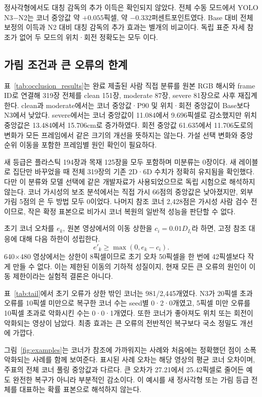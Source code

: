 정사각형에서도 대칭 감독의 추가 이득은 확인되지 않았다. 전체 수동 모드에서 YOLO N3−N2는 코너 중앙값 약 $+0.055$픽셀, \pckten 약 $-0.332$퍼센트포인트였다. Base 대비 전체 보정의 이득과 N2 대비 대칭 감독의 추가 효과는 별개의 비교이다. 독립 표준 자세 참조가 없어 두 모드의 위치·회전 정확도는 모두 \notrun 이다.

\subsection{가림 조건과 큰 오류의 한계}
표~\ref{tab:occlusion_results}는 완료 제출된 사람 직접 분류를 원본 RGB 해시와 frame ID로 연결해 319장 전체를 clean 151장, moderate 87장, severe 81장으로 사후 재집계한다. clean과 moderate에서는 코너 중앙값·P90 및 위치·회전 중앙값이 Base보다 N3에서 낮았다. severe에서는 코너 중앙값이 11.084에서 9.696픽셀로 감소했지만 위치 중앙값은 13.484에서 15.706cm로 증가하였다. 회전 중앙값 61.635에서 11.706도로의 변화가 모든 프레임에서 같은 크기의 개선을 뜻하지는 않는다. 가설 선택 변화와 중앙 순위 이동을 포함한 프레임별 원인 확인이 필요하다.


새 등급은 플라스틱 194장과 목재 125장을 모두 포함하며 미분류는 0장이다. 새 레이블로 집단만 바꾸었을 때 전체 319장의 기존 2D·6D 수치가 정확히 유지됨을 확인했다. 다만 이 분류와 모델 선택에 같은 개발자료가 사용되었으므로 독립 시험으로 해석하지 않는다. 코너 가시성의 보조 분석에서는 직접 가시 66점의 중앙값은 낮아졌지만, 외부 가림 5점의 \pckten 은 두 방법 모두 0이었다. 나머지 참조 코너 2,428점은 가시성 사람 검수 전이므로, 작은 확정 표본으로 비가시 코너 복원의 일반적 성능을 판단할 수 없다.

초기 코너 오차를 $e_k$, 원본 영상에서의 이동 상한을 $c_i=0.01D_{I_i}$라 하면, 고정 참조 대응에 대해 다음 하한이 성립한다.
\begin{equation}
 e'_k\geq\max(0,e_k-c_i).
\end{equation}
640$\times$480 영상에서는 상한이 8픽셀이므로 초기 오차 50픽셀을 한 번에 42픽셀보다 작게 만들 수 없다. 이는 제한된 이동의 기하적 성질이지, 현재 모든 큰 오류의 원인이 이동 제한이라는 실험적 결론은 아니다.

표~\ref{tab:tail}에서 초기 오류가 상한 밖인 코너는 981/2,445개였다. N3가 20픽셀 초과 오류를 10픽셀 미만으로 복구한 코너 수는 seed별 0·2·0개였고, 5픽셀 미만 오류를 10픽셀 초과로 악화시킨 수는 0·0·1개였다. 또한 코너가 좋아져도 위치 또는 회전이 악화되는 영상이 남았다. 최종 효과는 큰 오류의 전반적인 복구보다 국소 정밀도 개선에 가깝다.


그림~\ref{fig:examples}는 코너가 참조에 가까워지는 사례와 처음에는 정확했던 점이 소폭 악화되는 사례를 함께 보여준다. 표시된 사례 오차는 해당 영상의 평균 코너 오차이며, 주표의 전체 코너 풀링 중앙값과 다르다. 큰 오차가 27.21에서 25.42픽셀로 줄어든 예도 완전한 복구가 아니라 부분적인 감소이다. 이 예시를 새 정사각형 또는 가림 등급 전체를 대표하는 확률 표본으로 해석하지 않는다.


